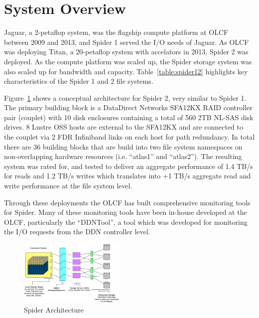 \section{System Overview}
\label{sec:overview}

Jaguar, a 2-petaflop system, was the flagship compute platform at OLCF between
2009 and 2013, and Spider 1 served the I/O needs of Jaguar. As OLCF was
deploying Titan, a 20-petaflop system with accelators in 2013, Spider 2 was
deployed. As the compute platform was scaled up, the Spider storage system was
also scaled up for bandwidth and capacity. Table~\ref{table:spider12} highlights
key characteristics of the Spider 1 and 2 file systems. 


Figure~\ref{fig:arch} shows a conceptual architecture for Spider 2, very similar to Spider 1. 
The primary building block is a DataDirect Networks SFA12KX RAID controller
pair (couplet) with 10 disk enclosures containing a total of 560 2TB NL-SAS disk drives.
8 Lustre OSS hosts are external to the SFA12KX and are connected to the couplet
via 2 FDR Infiniband links on each host for path redundancy. In total there are
36 building blocks that are build into two file system namespaces on
non-overlapping hardware resources (i.e. ``atlas1'' and ``atlas2''). The
resulting system was rated for, and tested to deliver an aggregate performance of 1.4 TB/s
for reads and 1.2 TB/s writes which translates into +1 TB/s aggregate read and
write performance at the file system level.



Through these deployments the OLCF has built comprehensive
monitoring tools for Spider\cite{ddntool10:ross}. Many of these monitoring
tools have been in-house developed at the OLCF, particularly the ``DDNTool'', a
tool which was developed for monitoring the I/O requests from the DDN
controller level. 



\begin{figure}[!t]
\centering
\includegraphics[width=0.45\textwidth]{./figs/spider2arch.ps}
\vspace{-0.1in}
\centering
\caption{Spider Architecture}
\label{fig:arch}
\end{figure}


